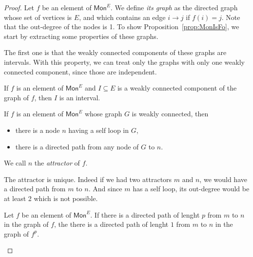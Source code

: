      \begin{proof}
     Let $f$ be an element of $\mathsf{Mon}^E$. We define \emph {its graph} as the directed graph whose set of vertices is $E$, and which contains an edge $i\rightarrow j$ if $f(i)=j$. Note that the out-degree of the nodes is 1. To show Proposition~\ref{prop:MonIsFo}, we start by extracting some properties of these graphs.
     
The first one is that the weakly connected components of these graphs are intervals. With this property, we can treat only the graphs with only one weakly connected component, since those are independent. 
     \begin{lemma}
     If $f$ is an element of $\mathsf{Mon}^E$ and $I\subseteq E$ is a weakly connected component of the graph of $f$, then $I$ is an interval. 
     \end{lemma}
     
     \begin{lemma}
     If $f$ is an element of $\mathsf{Mon}^E$ whose graph $G$ is weakly connected, then 
\begin{itemize}
\item there is a node $n$  having a self loop in $G$,
\item there is a directed path from any node of $G$ to $n$. 
\end{itemize}     
 We call $n$ the \emph{attractor} of $f$.    
     \end{lemma}  
     The attractor is unique. Indeed if we had two attractors $m$ and $n$, we would have a directed path from $m$ to $n$. And since $m$ has a self loop, its out-degree would be at least 2 which is not possible. 
      
    \begin{lemma}
    Let $f$ be an element of $\mathsf{Mon}^E$.  If there is a directed path of lenght $p$ from $m$ to $n$ in the graph of $f$, the there is a directed path of lenght $1$ from $m$ to $n$ in the graph of $f^p$.
    \end{lemma}
     \end{proof}